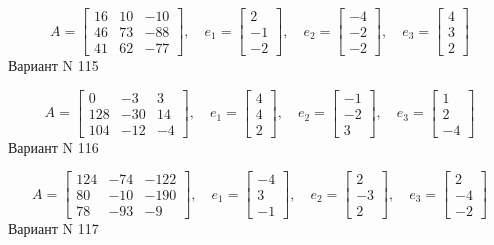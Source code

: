 \documentclass[11pt]{report}
\begin{document}
$$A = \left[\begin{matrix}16 & 10 & -10\\46 & 73 & -88\\41 & 62 & -77\end{matrix}\right],\quad e_1 = \left[\begin{matrix}2\\-1\\-2\end{matrix}\right],\quad e_2 = \left[\begin{matrix}-4\\-2\\-2\end{matrix}\right],\quad e_3 = \left[\begin{matrix}4\\3\\2\end{matrix}\right]$$Вариант N 115

$$A = \left[\begin{matrix}0 & -3 & 3\\128 & -30 & 14\\104 & -12 & -4\end{matrix}\right],\quad e_1 = \left[\begin{matrix}4\\4\\2\end{matrix}\right],\quad e_2 = \left[\begin{matrix}-1\\-2\\3\end{matrix}\right],\quad e_3 = \left[\begin{matrix}1\\2\\-4\end{matrix}\right]$$Вариант N 116

$$A = \left[\begin{matrix}124 & -74 & -122\\80 & -10 & -190\\78 & -93 & -9\end{matrix}\right],\quad e_1 = \left[\begin{matrix}-4\\3\\-1\end{matrix}\right],\quad e_2 = \left[\begin{matrix}2\\-3\\2\end{matrix}\right],\quad e_3 = \left[\begin{matrix}2\\-4\\-2\end{matrix}\right]$$Вариант N 117
\end{document}
